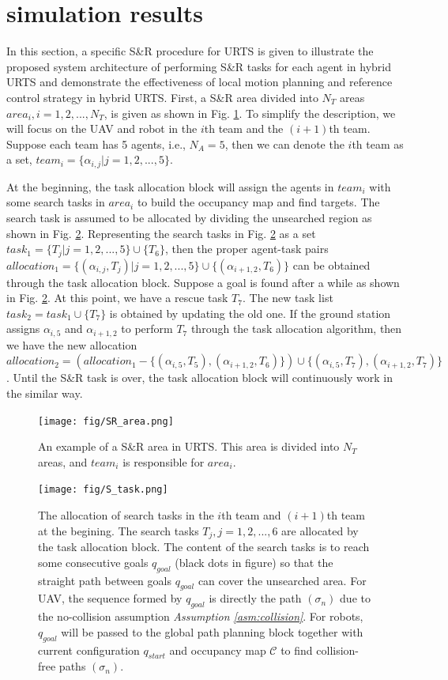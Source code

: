 \documentclass{ieeeaccess}
\begin{document}
\section{simulation results}
In this section, a specific S\&R procedure for URTS is given to illustrate the proposed system architecture of performing S\&R tasks for each agent in hybrid URTS and demonstrate the effectiveness of local motion planning and reference control strategy in hybrid URTS. First, a S\&R area divided into $N_T$ areas $area_i,i=1,2,...,N_T$, is given as shown in Fig. \ref{fig:SR_area}. To simplify the description, we will focus on the UAV and robot in the $i$th team and the $(i+1)$th team. Suppose each team has 5 agents, i.e., $N_A=5$, then we can denote the $i$th team as a set, $team_i=\{ \alpha_{i,j} | j=1,2,...,5 \}$.

At the beginning, the task allocation block will assign the agents in $team_i$ with some search tasks in $area_i$ to build the occupancy map and find targets. The search task is assumed to be allocated by dividing the unsearched region as shown in Fig. \ref{fig:S_task}. Representing the search tasks in Fig. \ref{fig:S_task} as a set $task_1=\{ T_j | j=1,2,...,5 \}\cup\{T_6\}$, then the proper agent-task pairs $allocation_1=\{ (\alpha_{i,j},T_j) | j=1,2,...,5 \}\cup\{(\alpha_{i+1,2},T_6)\}$ can be obtained through the task allocation block. Suppose a goal is found after a while as shown in Fig. \ref{fig:S_task}. At this point, we have a rescue task $T_7$. The new task list $task_2=task_1\cup\{ T_7 \}$ is obtained by updating the old one. If the ground station assigns $\alpha_{i,5}$ and $\alpha_{i+1,2}$ to perform $T_7$ through the task allocation algorithm, then we have the new allocation $allocation_2=(allocation_1-\{ (\alpha_{i,5},T_5),(\alpha_{i+1,2},T_6) \})\cup\{ (\alpha_{i,5},T_7),(\alpha_{i+1,2},T_7) \}$. Until the S\&R task is over, the task allocation block will continuously work in the similar way.
\begin{figure}[htbp]
    \centering
    \texttt{[image: fig/SR\_area.png]}\caption{An example of a S\&R area in URTS. This area is divided into $N_T$ areas, and $team_i$ is responsible for $area_i$.}%
    \label{fig:SR_area}
\end{figure}
\begin{figure}[htbp]
    \centering
    \texttt{[image: fig/S\_task.png]}\caption{The allocation of search tasks in the $i$th team and $(i+1)$th team at the begining. The search tasks $T_j,j=1,2,...,6$ are allocated by the task allocation block. The content of the search tasks is to reach some consecutive goals $q_{goal}$ (black dots in figure) so that the straight path between goals $q_{goal}$ can cover the unsearched area. For UAV, the sequence formed by $q_{goal}$ is directly the path $(\sigma_n)$ due to the no-collision assumption \textit{Assumption \ref{asm:collision}}. For robots, $q_{goal}$ will be passed to the global path planning block together with current configuration $q_{start}$ and occupancy map $\mathcal{C}$ to find collision-free paths $(\sigma_n)$.}
    \label{fig:S_task}
\end{figure}
\end{document}
